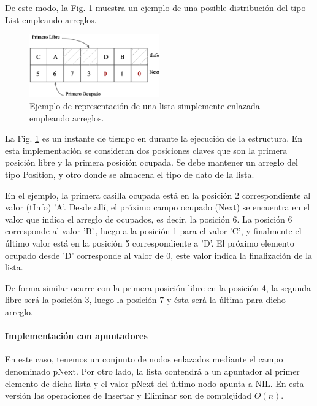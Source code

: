 De este modo, la Fig. \ref{fig:listarray} muestra un ejemplo de una posible distribución del tipo List empleando arreglos.

\begin{figure}[htpb!]
  \begin{center}
    \includegraphics[width=0.5\textwidth]{images/listarray.eps}
  \end{center}
  \caption{Ejemplo de representación de una lista simplemente enlazada empleando arreglos.}
  \label{fig:listarray}
\end{figure}

La Fig. \ref{fig:listarray} es un instante de tiempo en durante la ejecución de la estructura. En esta implementación se consideran dos posiciones claves que son la primera posición libre y la primera posición ocupada. Se debe mantener un arreglo del tipo Position, y otro donde se almacena el tipo de dato de la lista.

En el ejemplo, la primera casilla ocupada está en la posición 2 correspondiente al valor (tInfo)  'A'. Desde allí, el próximo campo ocupado (Next) se encuentra en el valor que indica el arreglo de ocupados, es decir, la posición 6. La posición 6 corresponde al valor 'B'., luego a la posición 1 para el valor 'C', y finalmente el último valor está en la posición 5 correspondiente a 'D'. El próximo elemento ocupado desde 'D' corresponde al valor de 0, este valor indica la finalización de la lista.

De forma similar ocurre con la primera posición libre en la posición 4, la segunda libre será la posición 3, luego la posición 7 y ésta será la última para dicho arreglo.

\paragraph{Implementación con apuntadores}

En este caso, tenemos un conjunto de nodos enlazados mediante el campo denominado pNext. Por otro lado, la lista contendrá a un apuntador al primer elemento de dicha lista y el valor pNext del último nodo apunta a NIL. En esta versión las operaciones de Insertar y Eliminar son de complejidad $O(n)$.

